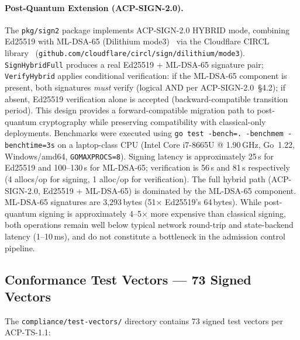 \documentclass[11pt]{article}
\theoremstyle{definition}
\begin{document}
\paragraph{Post-Quantum Extension (ACP-SIGN-2.0).}
The \texttt{pkg/sign2} package implements ACP-SIGN-2.0 HYBRID mode,
combining Ed25519 with ML-DSA-65 (Dilithium mode3)~\cite{nist2024fips204} via the Cloudflare CIRCL library~\cite{cloudflare-circl}
(\texttt{github.com/cloudflare/circl/sign/dilithium/mode3}).
\texttt{SignHybridFull} produces a real Ed25519 + ML-DSA-65 signature pair;
\texttt{VerifyHybrid} applies conditional verification:
if the ML-DSA-65 component is present, both signatures \emph{must} verify (logical AND per ACP-SIGN-2.0~\S4.2);
if absent, Ed25519 verification alone is accepted (backward-compatible transition period).
This design provides a forward-compatible migration path to post-quantum cryptography
while preserving compatibility with classical-only deployments.
Benchmarks were executed using \texttt{go test -bench=. -benchmem -benchtime=3s} on a laptop-class CPU
(Intel Core i7-8665U @ 1.90\,GHz, Go~1.22, Windows/amd64, \texttt{GOMAXPROCS=8}).
Signing latency is approximately 25\,\textmu s for Ed25519 and 100--130\,\textmu s for ML-DSA-65;
verification is 56\,\textmu s and 81\,\textmu s respectively
(4 allocs/op for signing, 1 alloc/op for verification).
The full hybrid path (ACP-SIGN-2.0, Ed25519 + ML-DSA-65) is dominated by the ML-DSA-65 component.
ML-DSA-65 signatures are 3,293\,bytes (51$\times$ Ed25519's 64\,bytes).
While post-quantum signing is approximately 4--5$\times$ more expensive than classical signing,
both operations remain well below typical network round-trip and state-backend latency (1--10\,ms),
and do not constitute a bottleneck in the admission control pipeline.

\subsection{Conformance Test Vectors --- 73 Signed Vectors}

The \texttt{compliance/test-vectors/} directory contains 73 signed test vectors per ACP-TS-1.1:
\end{document}
